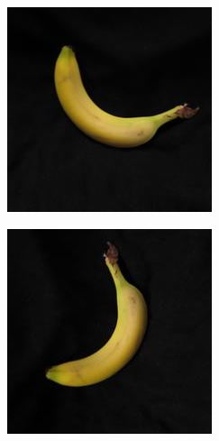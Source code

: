 \documentclass{article} %
\begin{document}
\begin{figure}[h]
\centering
  \begin{subfigure}{.123\textwidth}
  \centering
\includegraphics[width=\textwidth]{1_1.jpg}
\end{subfigure}%
 \begin{subfigure}{.123\textwidth}
  \centering
\includegraphics[width=\textwidth]{1_2.jpg}

\end{subfigure}
\end{figure}
\end{document}

